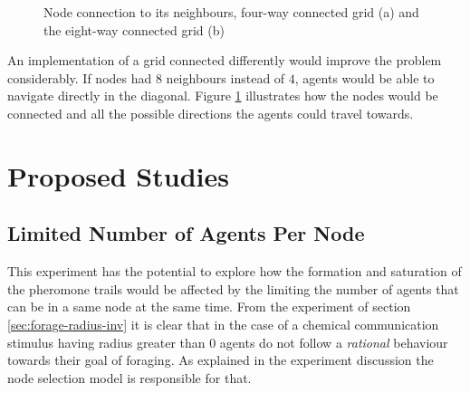 \begin{figure}[H]
\myfloatalign
{} \quad
{}

\caption{Node connection to its neighbours, four-way connected grid (a) and the eight-way connected grid (b)}
\label{fig:connection}
\end{figure}

An implementation of a grid connected differently would improve the problem considerably. If nodes had $8$ neighbours instead of $4$, agents would be able to navigate directly in the diagonal. Figure \ref{fig:connection} illustrates how the nodes would be connected and all the possible directions the agents could travel towards.

\section{Proposed Studies}
\label{sec:new-studies}

\subsection{Limited Number of Agents Per Node}

This experiment has the potential to explore how the formation and saturation of the pheromone trails would be affected by the limiting the number of agents that can be in a same node at the same time. From the experiment of section \ref{sec:forage-radius-inv} it is clear that in the case of a chemical communication stimulus having radius greater than $0$ agents do not follow a \emph{rational} behaviour towards their goal of foraging. As explained in the experiment discussion the node selection model is responsible for that.

